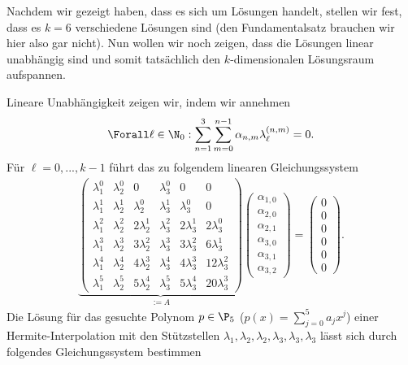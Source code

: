 \begin{solution}
\begin{enumerate}[label = \textbf{\alph*)}]
  Nachdem wir gezeigt haben, dass es sich um Lösungen handelt, stellen wir fest, dass es $k=6$ verschiedene Lösungen sind (den Fundamentalsatz brauchen wir hier also gar nicht). Nun wollen wir noch zeigen, dass die Lösungen linear unabhängig sind und somit tatsächlich den $k$-dimensionalen Lösungsraum aufspannen.

  Lineare Unabhängigkeit zeigen wir, indem wir annehmen
  \begin{align*}
    \Forall \ell \in \N_0: \sum_{n=1}^3 \sum_{m=0}^{n-1} \alpha_{n,m} \lambda_{\ell}^{(n,m)} = 0 .
  \end{align*}
  Für $\ell=0,...,k-1$ führt das zu folgendem linearen Gleichungssystem
  \begin{align*}
    \underbrace{\begin{pmatrix}
      \lambda_1^0 & \lambda_2^0 & 0 & \lambda_3^0 & 0 & 0\\
      \lambda_1^1 & \lambda_2^1 & \lambda_2^0 & \lambda_3^1 & \lambda_3^0 & 0\\
      \lambda_1^2 & \lambda_2^2 & 2\lambda_2^1 & \lambda_3^2 & 2\lambda_3^1 & 2\lambda_3^0\\
      \lambda_1^3 & \lambda_2^3 & 3\lambda_2^2 & \lambda_3^3 & 3\lambda_3^2 & 6\lambda_3^1\\
      \lambda_1^4 & \lambda_2^4 & 4\lambda_2^3 & \lambda_3^4 & 4\lambda_3^3 & 12\lambda_3^2\\
      \lambda_1^5 & \lambda_2^5 & 5\lambda_2^4 & \lambda_3^5 & 5\lambda_3^4 & 20\lambda_3^3
    \end{pmatrix}}_{:=A}
    \begin{pmatrix}
      \alpha_{1,0} \\ \alpha_{2,0} \\ \alpha_{2,1} \\ \alpha_{3,0}  \\ \alpha_{3,1}  \\ \alpha_{3,2}
    \end{pmatrix} =
    \begin{pmatrix}
      0 \\ 0 \\ 0 \\ 0 \\ 0 \\ 0
    \end{pmatrix}.
  \end{align*}
  Die Lösung für das gesuchte Polynom $p \in \P_5$ ($p(x) = \sum_{j=0}^5 a_j x^j$) einer Hermite-Interpolation mit den Stützstellen $\lambda_1, \lambda_2, \lambda_2, \lambda_3, \lambda_3, \lambda_3$ lässt sich durch folgendes Gleichungssystem bestimmen

\end{enumerate}
\end{solution}
